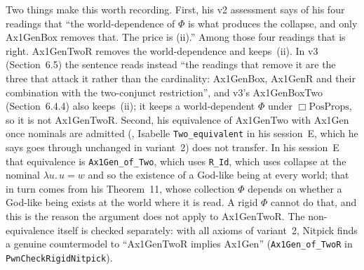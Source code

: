 \documentclass[11pt,a4paper]{article}
\newcommand{\Nec}{\Box}
\newcommand{\lean}[1]{\texttt{#1}}
\theoremstyle{definition}
\theoremstyle{remark}
\begin{document}
Two things make this worth recording.
First, his v2 assessment \cite[Sect.~6.4]{benzmuellerPWN2026} says of his four
readings that ``the world-dependence of \(\Phi\) is what produces the
collapse, and only Ax1GenBox removes that. The price is (ii).''
Among those four readings that is right.
Ax1GenTwoR removes the world-dependence and keeps~(ii).
In v3 (Section~6.5) the sentence reads instead ``the readings that remove it
are the three that attack it rather than the cardinality: Ax1GenBox, Ax1GenR
and their combination with the two-conjunct restriction'', and v3's
Ax1GenBoxTwo (Section~6.4.4) also keeps~(ii); it keeps a world-dependent
\(\Phi\) under \(\Nec\mathrm{PosProps}\), so it is not Ax1GenTwoR.
Second, his equivalence of Ax1GenTwo with Ax1Gen once nominals are admitted
(\cite[Sect.~6.2, Theorem~16(d); in v3 the text after Theorem~18]{benzmuellerPWN2026}, Isabelle
\lean{Two\_equivalent} in his session~E, which he says goes through
unchanged in variant~2) does not transfer.
In his session~E that equivalence is \lean{Ax1Gen\_of\_Two}, which uses
\lean{R\_Id}, which uses collapse at the nominal \(\lambda u.\, u = w\) and
so the existence of a God-like being at every world; that in turn comes
from his Theorem~11, whose collection \(\Phi\) depends on whether a God-like
being exists at the world where it is read.
A rigid \(\Phi\) cannot do that, and this is the reason the argument does
not apply to Ax1GenTwoR.
The non-equivalence itself is checked separately: with all axioms of
variant~2, Nitpick finds a genuine countermodel to ``Ax1GenTwoR implies
Ax1Gen'' (\lean{Ax1Gen\_of\_TwoR} in \lean{PwnCheckRigidNitpick}).
\end{document}
